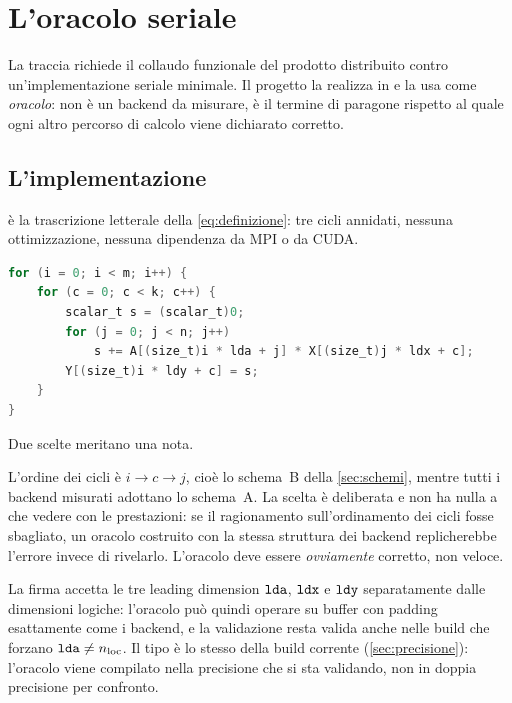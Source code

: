 \chapter{L'oracolo seriale}
\label{app:oracolo}

La traccia richiede il collaudo funzionale del prodotto distribuito contro
un'implementazione seriale minimale. Il progetto la realizza in
 e la usa come \emph{oracolo}: non è un backend da
misurare, è il termine di paragone rispetto al quale ogni altro percorso di
calcolo viene dichiarato corretto.

\section{L'implementazione}
\label{sec:oracolo-implementazione}

 è la trascrizione letterale della \cref{eq:definizione}:
tre cicli annidati, nessuna ottimizzazione, nessuna dipendenza da MPI o da CUDA.

\begin{lstlisting}[language=C,caption={Il nucleo di \file{src/serial/serial.c}.},label={lst:oracolo}]
for (i = 0; i < m; i++) {
    for (c = 0; c < k; c++) {
        scalar_t s = (scalar_t)0;
        for (j = 0; j < n; j++)
            s += A[(size_t)i * lda + j] * X[(size_t)j * ldx + c];
        Y[(size_t)i * ldy + c] = s;
    }
}
\end{lstlisting}

Due scelte meritano una nota.

L'ordine dei cicli è $i \to c \to j$, cioè lo schema~B della
\cref{sec:schemi}, mentre tutti i backend misurati adottano lo schema~A. La
scelta è deliberata e non ha nulla a che vedere con le prestazioni: se il
ragionamento sull'ordinamento dei cicli fosse sbagliato, un oracolo costruito
con la stessa struttura dei backend replicherebbe l'errore invece di
rivelarlo. L'oracolo deve essere \emph{ovviamente} corretto, non veloce.

La firma accetta le tre leading dimension $\texttt{lda}$, $\texttt{ldx}$ e
$\texttt{ldy}$ separatamente dalle dimensioni logiche: l'oracolo può quindi
operare su buffer con padding esattamente come i backend, e la validazione
resta valida anche nelle build che forzano $\texttt{lda} \neq n_{\text{loc}}$.
Il tipo  è lo stesso della build corrente
(\cref{sec:precisione}): l'oracolo viene compilato nella precisione che si sta
validando, non in doppia precisione per confronto.


